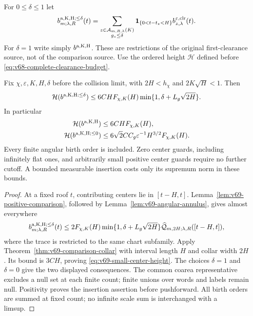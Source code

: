 For $0\le\delta\le1$ let
\begin{equation}\label{eq:v69-small-center-source}
 b^{\rm a,K,H;\le\delta}_{m;\lambda,R}(t)
 =\sum_{\substack{z\in\mathcal A_{m,R,\lambda}(K)\\g_z\le\delta}}
       \one_{\{0<t-t_z<H\}}
                   b_{z,\lambda}^{\varepsilon,\mathrm{clr}}(t).
\end{equation}
For $\delta=1$ write simply $b^{\rm a,K,H}$. These are restrictions
of the original first-clearance source, not of the comparison source.
Use the ordered height $\mathcal H$ defined before
\eqref{eq:v68-complete-clearance-budget}.

\begin{theorem}
\label{thm:v69-absolute-guard-height}
Fix $\chi,\varepsilon,K,H,\delta$ before the collision limit, with
$2H<h_\chi$ and $2K\sqrt H<1$. Then
\begin{equation}\label{eq:v69-small-center-height}
 \mathcal H(b^{\rm a,K,H;\le\delta})
 \le6CH F_{\chi,K}(H)
                    \min\{1,\delta+L_g\sqrt{2H}\}.
\end{equation}
In particular
\begin{align}
 \mathcal H(b^{\rm a,K,H})
            &\le6CH F_{\chi,K}(H),
                                      \label{eq:v69-all-center-height}\\
 \mathcal H(b^{\rm a,K,H;\le0})
            &\le6\sqrt2 C C_g\varepsilon^{-1}
                                H^{3/2}F_{\chi,K}(H).
                                      \label{eq:v69-zero-center-height}
\end{align}
Every finite angular birth order is included. Zero center guards,
including infinitely flat ones, and arbitrarily small positive
center guards require no further cutoff. A bounded measurable
insertion costs only its supremum norm in these bounds.
\end{theorem}
\begin{proof}
At a fixed roof $t$, contributing centers lie in $[t-H,t]$.
Lemma~\ref{lem:v69-positive-comparison}, followed by
Lemma~\ref{lem:v69-angular-annulus}, gives almost everywhere
\[
 b^{\rm a,K,H;\le\delta}_{m;\lambda,R}(t)
 \le 2F_{\chi,K}(H)\min\{1,\delta+L_g\sqrt{2H}\}
             \widehat{\mathcal Q}_{m,2H;\lambda,R}([t-H,t]),
\]
where the trace is restricted to the same chart subfamily. Apply
Theorem~\ref{thm:v69-comparison-collar} with interval length $H$
and collar width $2H$. Its bound is $3CH$, proving
\eqref{eq:v69-small-center-height}. The choices $\delta=1$ and
$\delta=0$ give the two displayed consequences. The common coarea
representative excludes a null set at each finite count; finite
unions over words and labels remain null. Positivity proves the
insertion assertion before pushforward. All birth orders are summed
at fixed count; no infinite scale sum is interchanged with a limsup.
\end{proof}

